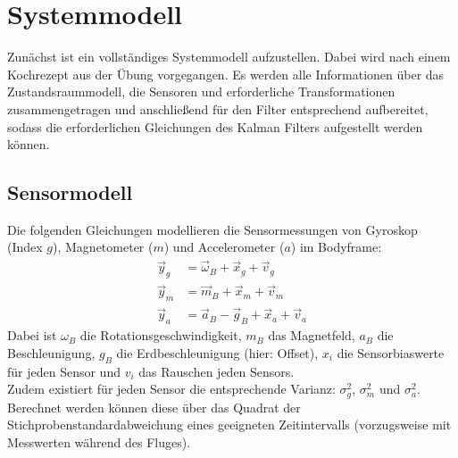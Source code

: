 \documentclass[12pt,a4paper]{article}
\begin{document}
	\section{Systemmodell}\label{sec:Systemmodell}
	Zunächst ist ein vollständiges Systemmodell aufzustellen. Dabei wird nach einem Kochrezept aus der Übung vorgegangen. Es werden alle Informationen über das Zustandsraummodell, die Sensoren und erforderliche Transformationen zusammengetragen und anschließend für den Filter entsprechend aufbereitet, sodass die erforderlichen Gleichungen des Kalman Filters aufgestellt werden können.
		\subsection{Sensormodell}\label{subsec:Sensormodell}
		Die folgenden Gleichungen modellieren die Sensormessungen von Gyroskop (Index $g$), Magnetometer ($m$) und Accelerometer ($a$) im Bodyframe:
		\begin{align}
			\vec{y}_{g}&=\vec{\omega}_{B}+\vec{x}_{g}+\vec{v}_{g}\label{eq:Sensormodell1}\\
			\vec{y}_{m}&=\vec{m}_{B}+\vec{x}_{m}+\vec{v}_{m}\label{eq:Sensormodell2}\\
			\vec{y}_{a}&=\vec{a}_{B}-\vec{g}_{B}+\vec{x}_{a}+\vec{v}_{a}\label{eq:Sensormodell3}
		\end{align}
		Dabei ist $\omega_{B}$ die Rotationsgeschwindigkeit, $m_{B}$ das Magnetfeld, $a_{B}$ die Beschleunigung, $g_{B}$ die Erdbeschleunigung (hier: Offset), $x_{i}$ die Sensorbiaswerte für jeden Sensor und $v_{i}$ das Rauschen jeden Sensors.\\
		Zudem existiert für jeden Sensor die entsprechende Varianz: $\sigma_{g}^{2}$, $\sigma_{m}^{2}$ und $\sigma_{a}^{2}$. Berechnet werden können diese über das Quadrat der Stichprobenstandardabweichung eines geeigneten Zeitintervalls (vorzugsweise mit Messwerten während des Fluges).
\end{document}
